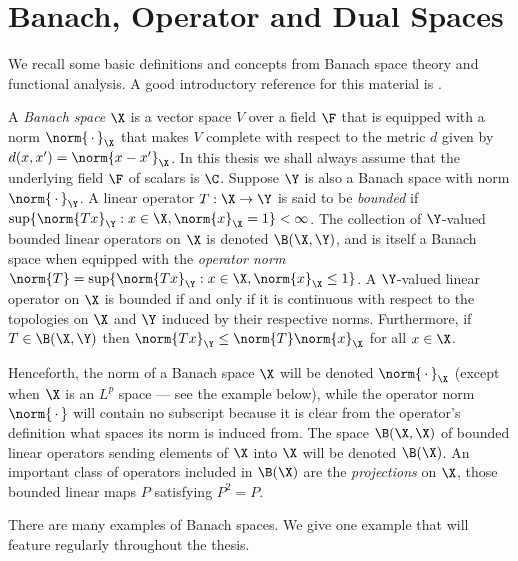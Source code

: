\section{Banach, Operator and Dual Spaces}\label{Banach Spaces}



We recall some basic definitions and concepts from Banach space theory and
functional analysis. A good introductory reference for this material is
\cite{TEST}.

A {\em Banach space} $\X$ is a vector space $V$ over a field $\F$ that is
equipped with a norm
$\norm{\,\cdot\,}_{\X}$ that makes $V$ complete with respect to the metric $d$
given by $d(x,x')=\norm{x-x'}_{\X}$. In this thesis we shall always assume that
the
underlying field $\F$ of scalars is $\C$. Suppose $\Y$ is also a Banach space
with norm $\norm{\,\cdot\,}_{\Y}$. A linear operator
$T:\X\rightarrow\Y$ is said to be {\em bounded} if
$\sup\{\norm{Tx}_{\Y}:x\in\X,\norm{x}_{\X}=1\}<\infty$. The collection of
$\Y$-valued bounded linear operators on $\X$ is denoted $\B(\X,\Y)$, and is
itself a Banach space when equipped with the {\em operator norm}
$\norm{T}=\sup\{\norm{Tx}_{\Y}:x\in\X,\norm{x}_{\X}\leq 1\}$. A $\Y$-valued
linear
operator on $\X$ is bounded if and only if it is continuous with respect to the
topologies on $\X$ and $\Y$ induced by their respective norms. Furthermore, if
$T\in\B(\X,\Y)$ then $\norm{Tx}_{\Y}\leq\norm{T}\norm{x}_{\X}$ for all $x\in\X$.

Henceforth, the norm of a Banach space $\X$ will be denoted
$\norm{\,\cdot\,}_{\X}$ (except when $\X$ is an $L^p$ space --- see the
example below), while the operator norm $\norm{\,\cdot\,}$ will
contain no subscript because it is clear from the operator's definition what
spaces its norm is induced from. The space $\B(\X,\X)$ of bounded linear
operators sending elements of $\X$ into $\X$ will be denoted $\B(\X)$. An
important class of operators included in $\B(\X)$ are the {\em projections} on
$\X$, those bounded linear maps $P$ satisfying $P^2=P$.

There are many examples of Banach spaces. We give one example that will feature
regularly throughout the thesis.

